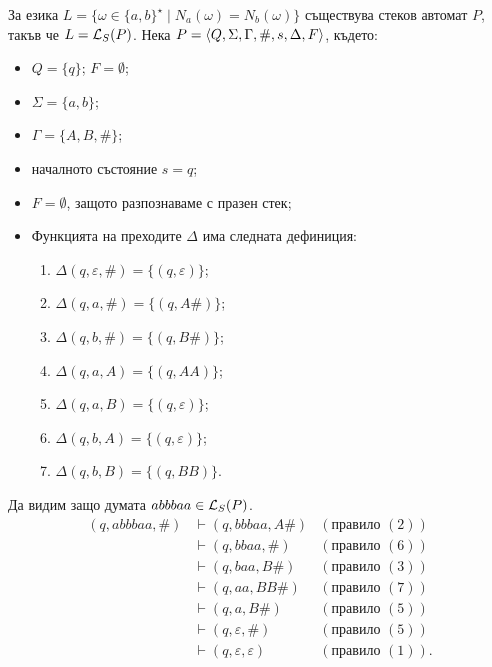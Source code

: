 \begin{example}
  За езика $L = \{\omega \in \{a,b\}^\star \mid N_a(\omega) = N_b(\omega)\}$ съществува стеков автомат $P$, такъв че
  $L = \mathcal{L}_S(P)$.
  Нека $P = \langle{Q,\Sigma,\Gamma,\#,s,\Delta,F}\rangle$, където:
  \begin{itemize}
  \item 
    $Q = \{q\}$; $F = \emptyset$;
  \item
    $\Sigma = \{a,b\}$;
  \item
    $\Gamma = \{A, B, \#\}$;
  \item
    началното състояние $s = q$;
  \item
    $F = \emptyset$, защото разпознаваме с празен стек;
  \item
    Функцията на преходите $\Delta$ има следната дефиниция:
    \begin{enumerate}[(1)]
    \item 
      $\Delta(q, \varepsilon, \#) = \{(q, \varepsilon)\}$;
    \item
      $\Delta(q, a, \#) = \{(q, A\#)\}$;
    \item
      $\Delta(q, b, \#) = \{(q, B\#)\}$;
    \item
      $\Delta(q, a, A) = \{(q, AA)\}$;
    \item
      $\Delta(q, a, B) = \{(q, \varepsilon)\}$;
    \item
      $\Delta(q, b, A) = \{(q, \varepsilon)\}$;
    \item
      $\Delta(q, b, B) = \{(q, BB)\}$.
    \end{enumerate}
  \end{itemize}
  Да видим защо думата $abbbaa \in \mathcal{L}_S(P)$.
  \begin{align*}
    (q, abbbaa, \#) & \vdash (q, bbbaa, A\#) & (\text{правило }(2))\\
    & \vdash (q, bbaa, \#) & (\text{правило }(6))\\
    & \vdash (q, baa, B\#) & (\text{правило }(3))\\
    & \vdash (q, aa, BB\#) & (\text{правило }(7))\\
    & \vdash (q, a, B\#) & (\text{правило }(5))\\
    & \vdash (q, \varepsilon, \#) & (\text{правило }(5))\\
    & \vdash (q, \varepsilon, \varepsilon) & (\text{правило }(1)).
  \end{align*}
\end{example}

